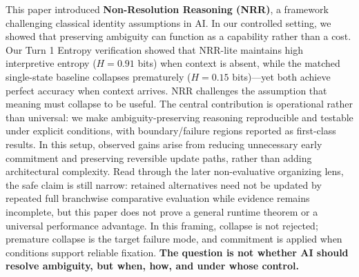 \documentclass[11pt,a4paper]{article}
\begin{document}
This paper introduced \textbf{Non-Resolution Reasoning (NRR)}, a framework challenging classical identity assumptions in AI.
In our controlled setting, we showed that preserving ambiguity can function as a capability rather than a cost.
Our Turn 1 Entropy verification showed that NRR-lite maintains high interpretive entropy ($H = 0.91$ bits) when context is absent, while the matched single-state baseline collapses prematurely ($H = 0.15$ bits)---yet both achieve perfect accuracy when context arrives.
NRR challenges the assumption that meaning must collapse to be useful.
The central contribution is operational rather than universal: we make ambiguity-preserving reasoning reproducible and testable under explicit conditions, with boundary/failure regions reported as first-class results.
In this setup, observed gains arise from reducing unnecessary early commitment and preserving reversible update paths, rather than adding architectural complexity. Read through the later non-evaluative organizing lens, the safe claim is still narrow: retained alternatives need not be updated by repeated full branchwise comparative evaluation while evidence remains incomplete, but this paper does not prove a general runtime theorem or a universal performance advantage.
In this framing, collapse is not rejected; premature collapse is the target failure mode, and commitment is applied when conditions support reliable fixation.
\textbf{The question is not whether AI should resolve ambiguity, but when, how, and under whose control.}
\end{document}
